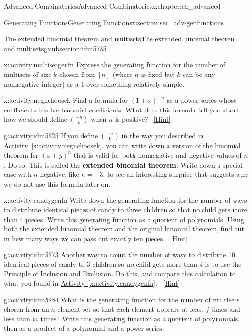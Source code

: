 \documentclass[oneside,10pt,]{book}
\newcommand{\terminology}[1]{\textbf{#1}}
\numberwithin{equation}{chapter}
\begin{document}
\begin{chapterptx}{Advanced Combinatorics}{}{Advanced Combinatorics}{}{}{x:chapter:ch_advanced}
\begin{sectionptx}{Generating Functions}{}{Generating Functions}{}{}{x:section:sec_adv-genfunctions}
\begin{subsectionptx}{The extended binomial theorem and multisets}{}{The extended binomial theorem and multisets}{}{}{g:subsection:idm5735}
\begin{activity}{}{x:activity:multisetgenfn}%
Express the generating function for the number of multisets of size \(k\) chosen from \([n]\) (where \(n\) is fixed but \(k\) can be any nonnegative integer) as a 1 over something relatively simple.%
\end{activity}
\begin{activity}{}{x:activity:negnchoosek}%
Find a formula for \((1+x)^{-n}\) as a power series whose coefficients involve binomial coefficients. What does this formula tell you about how we should define \(\binom{-n}{k}\) when \(n\) is positive?%
\qquad~\hfill{\tiny\hyperlink{g:hint:idm5812-back}{[Hint]}}\end{activity}
\begin{activity}{}{g:activity:idm5825}%
If you define \(\binom{-n}{k}\) in the way you described in \hyperref[x:activity:negnchoosek]{Activity~\ref{x:activity:negnchoosek}}, you can write down a version of the binomial theorem for \((x+y)^n\) that is valid for both nonnegative and negative values of \(n\). Do so. This is called the \terminology{extended binomial theorem}. Write down a special case with \(n\) negative, like \(n=-3\), to see an interesting surprise that suggests why we do not use this formula later on.%
\end{activity}
\begin{activity}{}{x:activity:candygenfn}%
Write down the generating function for the number of ways to distribute identical pieces of candy to three children so that no child gets more than 4 pieces. Write this generating function as a quotient of polynomials. Using both the extended binomial theorem and the original binomial theorem, find out in how many ways we can pass out exactly ten pieces.%
\qquad~\hfill{\tiny\hyperlink{g:hint:idm5857-back}{[Hint]}}\end{activity}
\begin{activity}{}{g:activity:idm5873}%
Another way to count the number of ways to distribute 10 identical pieces of candy to 3 children so no child gets more than 4 is to use the Principle of Inclusion and Exclusion.  Do this, and compare this calculation to what you found in \hyperref[x:activity:candygenfn]{Activity~\ref{x:activity:candygenfn}}.%
\qquad~\hfill{\tiny\hyperlink{g:hint:idm5877-back}{[Hint]}}\end{activity}
\begin{activity}{}{g:activity:idm5884}%
What is the generating function for the number of multisets chosen from an \(n\)-element set so that each element appears at least \(j\) times and less than \(m\) times? Write this generating function as a quotient of polynomials, then as a product of a polynomial and a power series.%

\end{activity}
\end{subsectionptx}
\end{sectionptx}
\end{chapterptx}
\end{document}
